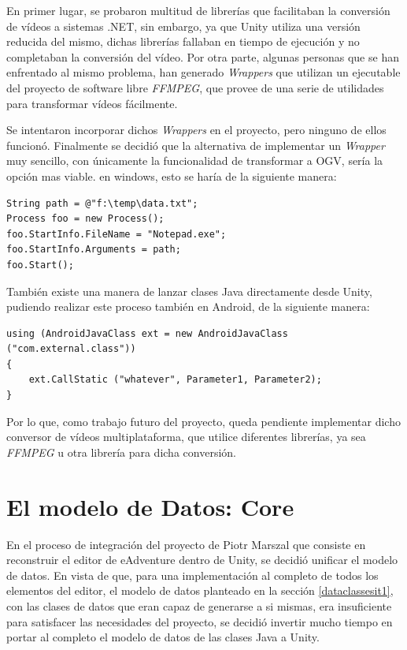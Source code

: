 En primer lugar, se probaron multitud de librerías que facilitaban la conversión de vídeos a sistemas .NET, sin embargo, ya que Unity utiliza una versión reducida del mismo, dichas librerías fallaban en tiempo de ejecución y no completaban la conversión del vídeo. Por otra parte, algunas personas que se han enfrentado al mismo problema, han generado \textit{Wrappers} que utilizan un ejecutable del proyecto de software libre \textit{FFMPEG}, que provee de una serie de utilidades para transformar vídeos fácilmente.

Se intentaron incorporar dichos \textit{Wrappers} en el proyecto, pero ninguno de ellos funcionó. Finalmente se decidió que la alternativa de implementar un \textit{Wrapper} muy sencillo, con únicamente la funcionalidad de transformar a OGV, sería la opción mas viable. en windows, esto se haría de la siguiente manera:

\begin{lstlisting}
String path = @"f:\temp\data.txt";
Process foo = new Process();
foo.StartInfo.FileName = "Notepad.exe";
foo.StartInfo.Arguments = path;
foo.Start();
\end{lstlisting}

También existe una manera de lanzar clases Java directamente desde Unity, pudiendo realizar este proceso también en Android, de la siguiente manera:

\begin{lstlisting}
using (AndroidJavaClass ext = new AndroidJavaClass ("com.external.class")) 
{
	ext.CallStatic ("whatever", Parameter1, Parameter2);
}
\end{lstlisting}

Por lo que, como trabajo futuro del proyecto, queda pendiente implementar dicho conversor de vídeos multiplataforma, que utilice diferentes librerías, ya sea \textit{FFMPEG} u otra librería para dicha conversión.

\section{El modelo de Datos: Core}
\label{coreit2}

En el proceso de integración del proyecto de Piotr Marszal que consiste en reconstruir el editor de eAdventure dentro de Unity, se decidió unificar el modelo de datos. En vista de que, para una implementación al completo de todos los elementos del editor, el modelo de datos planteado en la sección \ref{dataclassesit1}, con las clases de datos que eran capaz de generarse a si mismas, era insuficiente para satisfacer las necesidades del proyecto, se decidió invertir mucho tiempo en portar al completo el modelo de datos de las clases Java a Unity.

